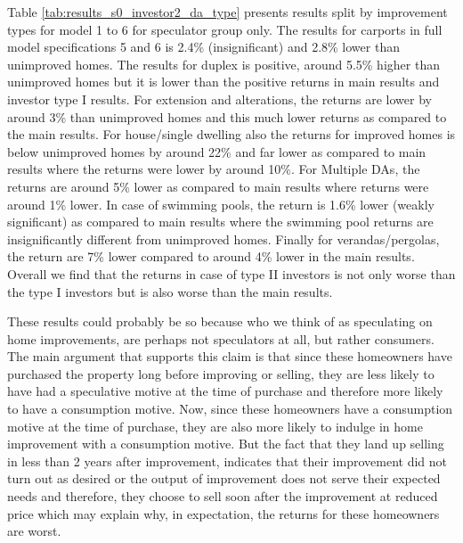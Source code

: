 \documentclass[AEJ,reqno, draftmode]{AEA} %
\begin{document}
Table \ref{tab:results_s0_investor2_da_type} presents results split by improvement types for model 1 to 6 for speculator group only. The results for carports in full model specifications 5 and 6 is 2.4\% (insignificant) and 2.8\% lower than unimproved homes. The results for duplex is positive, around 5.5\% higher than unimproved homes but it is lower than the positive returns in main results and investor type I results. For extension and alterations, the returns are lower by around 3\% than unimproved homes and this much lower returns as compared to the main results. For house/single dwelling also the returns for improved homes is below unimproved homes by around 22\% and far lower as compared to main results where the returns were lower by around 10\%. For Multiple DAs, the returns are around 5\% lower as compared to main results where returns were around 1\% lower. In case of swimming pools, the return is 1.6\% lower (weakly significant) as compared to main results where the swimming pool returns are insignificantly different from unimproved homes. Finally for verandas/pergolas, the return are 7\% lower compared to around 4\% lower in the main results. Overall we find that the returns in case of type II investors is not only worse than the type I investors but is also worse than the main results. 

These results could probably be so because who we think of as speculating on home improvements, are perhaps not speculators at all, but rather consumers. The main argument that supports this claim is that since these homeowners have purchased the property long before improving or selling, they are less likely to have had a speculative motive at the time of purchase and therefore more likely to have a consumption motive. Now, since these homeowners have a consumption motive at the time of purchase, they are also more likely to indulge in home improvement with a consumption motive. But the fact that they land up selling in less than 2 years after improvement, indicates that their improvement did not turn out as desired or the output of improvement does not serve their expected needs and therefore, they choose to sell soon after the improvement at reduced price which may explain why, in expectation, the returns for these homeowners are worst.


\restoregeometry


%
%
\end{document}
